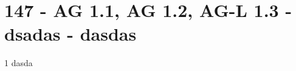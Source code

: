 \section{147 - AG 1.1, AG 1.2, AG-L 1.3 - dsadas - dasdas}

\begin{langesbeispiel}\item[1] %
dasda

\end{langesbeispiel}